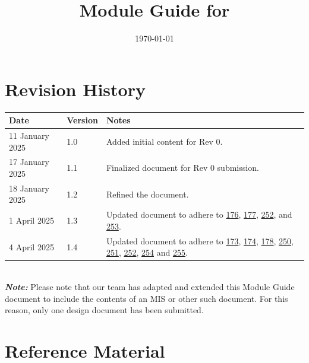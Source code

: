 \documentclass[12pt, titlepage]{article}
\begin{document}
\title{Module Guide for \progname{}} 
\author{\authname}
\date{\today}

\maketitle


\section{Revision History}

\begin{tabularx}{\textwidth}{p{3cm}p{2cm}X}
\toprule {\bf Date} & {\bf Version} & {\bf Notes}\\
\midrule
11 January 2025 & 1.0 & Added initial content for Rev 0.\\
17 January 2025 & 1.1 & Finalized document for Rev 0 submission.\\
18 January 2025 & 1.2 & Refined the document.\\
1 April 2025 & 1.3 & Updated document to adhere to
\href{https://github.com/SumanyaG/Alkalytics/issues/176}{176},
\href{https://github.com/SumanyaG/Alkalytics/issues/177}{177},
\href{https://github.com/SumanyaG/Alkalytics/issues/252}{252}, and
\href{https://github.com/SumanyaG/Alkalytics/issues/253}{253}. \\
4 April 2025 & 1.4 & Updated document to adhere to 
\href{https://github.com/SumanyaG/Alkalytics/issues/173}{173},
\href{https://github.com/SumanyaG/Alkalytics/issues/174}{174},
\href{https://github.com/SumanyaG/Alkalytics/issues/178}{178},
\href{https://github.com/SumanyaG/Alkalytics/issues/250}{250},
\href{https://github.com/SumanyaG/Alkalytics/issues/251}{251},
\href{https://github.com/SumanyaG/Alkalytics/issues/252}{252},
\href{https://github.com/SumanyaG/Alkalytics/issues/254}{254} and 
\href{https://github.com/SumanyaG/Alkalytics/issues/255}{255}. \\
\bottomrule
\end{tabularx}
\\
\newline \newline
\emph{\textbf{Note:}} Please note that our team has adapted and extended this
Module Guide document to include the contents of an MIS or other such document.
For this reason, only one design document has been submitted.
\newpage

\section{Reference Material}
\end{document}
